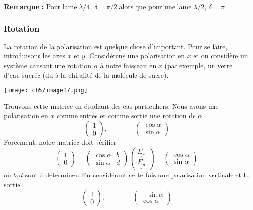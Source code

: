 		\textbf{Remarque :} Pour lame $\lambda/4$, $\delta = \pi/2$ alors que pour une lame $\lambda/2$, $\delta = \pi$
		
		\subsubsection{Rotation}
		La rotation de la polarisation est quelque chose d'important. Pour se faire, introduisons 
		les axes $x$ et $y$. Considérons une polarisation en $x$ et on considère un système causant 
		une rotation $\alpha$ à notre faisceau en $x$ (par exemple, un verre d'eau sucrée (du à la 
		chiralité de la molécule de sucre).
	\begin{center}
	\texttt{[image: ch5/image17.png]}
\end{center}			
	 Trouvons cette matrice en étudiant des cas particuliers. 
		Nous avons une polarisation en $x$ comme entrée et comme sortie une rotation de $\alpha$
		\begin{equation}
		\left(\begin{array}{c}
		1\\
		0
		\end{array}\right),\qquad\qquad		\left(\begin{array}{c}
		\cos\alpha\\
		\sin\alpha
		\end{array}\right)
		\end{equation}
		Forcément, notre matrice doit vérifier
		\begin{equation}
			\left(\begin{array}{c}
		1\\
		0
		\end{array}\right) = \left(\begin{array}{cc}
		\cos\alpha & b\\
		\sin\alpha & d
		\end{array}\right)\left(\begin{array}{c}
		\underline{E_x}\\
		\underline{E_y}
		\end{array}\right)= \left(\begin{array}{c}
		\cos\alpha\\
		\sin\alpha
		\end{array}\right)
		\end{equation}
		où $b,d$ sont à déterminer. En considérant cette fois une polarisation verticale et la sortie
		\begin{equation}
				\left(\begin{array}{c}
		1\\
		0
		\end{array}\right),\qquad\qquad		\left(\begin{array}{c}
		-\sin\alpha\\
		\cos\alpha
		\end{array}\right)
	\end{equation}				
